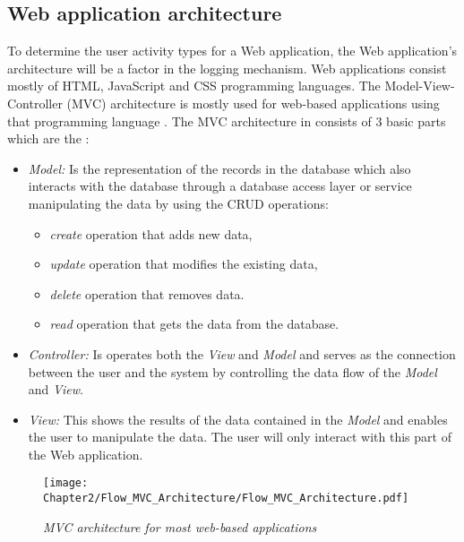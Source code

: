 \subsection{Web application architecture}\label{sec:ch2:webApplicationArchitecture}
To determine the user activity types for a Web application, the Web application's architecture will be a factor in the logging mechanism. Web applications consist mostly of HTML, JavaScript and CSS programming languages. The Model-View-Controller (MVC) architecture is mostly used for web-based applications using that programming language \cite{Jailia2016}. The MVC architecture in  consists of 3 basic parts which are the \cite{Jailia2016}:

\begin{itemize}
	\item \textit{Model:} Is the representation of the records in the database which also interacts with the database through a database access layer or service manipulating the data by using the CRUD operations:
	\begin{itemize}
		\item \textit{create} operation that adds new data,
		\item \textit{update} operation that modifies the existing data,
		\item \textit{delete} operation that removes data.
		\item \textit{read} operation that gets the data from the database.
	\end{itemize}
	\item \textit{Controller:} Is operates both the \textit{View} and \textit{Model} and serves as the connection between the user and the system by controlling the data flow of the \textit{Model} and
	\textit{View}.
	\item \textit{View:} This shows the results of the data contained in the \textit{Model} and enables the user to manipulate the data. The user will only interact with this part of the Web application.
\end{itemize}

\begin{figure}[!htb] %
	\centering %
	\texttt{[image: Chapter2/Flow\_MVC\_Architecture/Flow\_MVC\_Architecture.pdf]}
	\caption[MVC architecture for most web-based applications]
	{\textit{MVC architecture for most web-based applications \cite{Gu2010}}}\label{fig:ch2_flowMVC_Architecture}
\end{figure}


